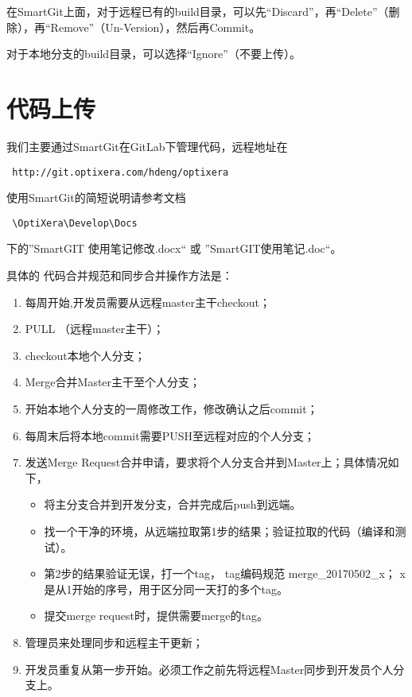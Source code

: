 在SmartGit上面，对于远程已有的build目录，可以先“Discard”，再“Delete”（删除），再“Remove”（Un-Version），然后再Commit。

对于本地分支的build目录，可以选择“Ignore”（不要上传）。

\section{代码上传} \label{SectCodeSync}
我们主要通过SmartGit在GitLab下管理代码，远程地址在
\begin{verbatim} http://git.optixera.com/hdeng/optixera \end{verbatim} 
使用SmartGit的简短说明请参考文档
\begin{verbatim} \OptiXera\Develop\Docs \end{verbatim} 
下的”SmartGIT 使用笔记修改.docx“ 或 ”SmartGIT使用笔记.doc“。

具体的{\color{red} 代码合并规范和同步合并}操作方法是：
\begin{enumerate}
	\item 每周开始,开发员需要从远程master主干checkout；
	\item PULL （远程master主干）；
	\item checkout本地个人分支；
	\item Merge合并Master主干至个人分支；
	\item 开始本地个人分支的一周修改工作，修改确认之后commit；
	\item 每周末后将本地commit需要PUSH至远程对应的个人分支；
	\item 发送Merge Request合并申请，要求将个人分支合并到Master上；具体情况如下，
	\begin{itemize}
		\item 将主分支合并到开发分支，合并完成后push到远端。
		\item 找一个干净的环境，从远端拉取第1步的结果；验证拉取的代码（编译和测试）。
		\item 第2步的结果验证无误，打一个tag， tag编码规范 merge\_20170502\_x； x是从1开始的序号，用于区分同一天打的多个tag。
		\item 提交merge request时，提供需要merge的tag。
	\end{itemize}
	\item 管理员来处理同步和远程主干更新；
	\item 开发员重复从第一步开始。必须工作之前先将远程Master同步到开发员个人分支上。
\end{enumerate}

\pagestyle{empty}
\cleardoublepage
